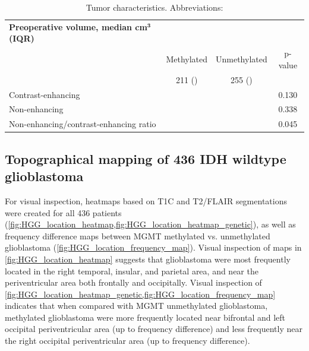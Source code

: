 \begin{table}
\begin{tabular}{L{5cm} S[table-number-alignment=center-decimal-marker, table-format=2.1] S[table-number-alignment=center-decimal-marker, table-format=2.1] S[table-number-alignment=center-decimal-marker, table-format=0.3]}
    \toprule
    {\textbf{Preoperative volume, median cm$^\textbf{3}$ (IQR)}}& \\
     & {Methylated} & {Unmethylated} & {p-value}\\
     & {211 ()} & {255 ()}\\
    \midrule
    Contrast-enhancing &  &  & 0.130\\
    Non-enhancing &  &  & 0.338\\
    Non-enhancing/contrast-enhancing ratio &  &  & 0.045\\
    \bottomrule
\end{tabular}
\caption{Tumor characteristics. Abbreviations: }\label{tab:HGG_location_tumor_characteristics}
\end{table}

\subsection{Topographical mapping of 436 \acrshort{IDH} wildtype glioblastoma}

For visual inspection, heatmaps based on \gls{T1C} and \gls{T2}/\gls{FLAIR} segmentations were created for all 436 patients (\cref{fig:HGG_location_heatmap,fig:HGG_location_heatmap_genetic}), as well as frequency difference maps between MGMT methylated vs. unmethylated glioblastoma (\cref{fig:HGG_location_frequency_map}).
Visual inspection of maps in \cref{fig:HGG_location_heatmap} suggests that glioblastoma were most frequently located in the right temporal, insular, and parietal area, and near the periventricular area both frontally and occipitally.
Visual inspection of \cref{fig:HGG_location_heatmap_genetic,fig:HGG_location_frequency_map} indicates that when compared with \gls{MGMT} unmethylated glioblastoma, methylated glioblastoma were more frequently located near bifrontal and left occipital periventricular area (up to  frequency difference) and less frequently near the right occipital periventricular area (up to  frequency difference).

